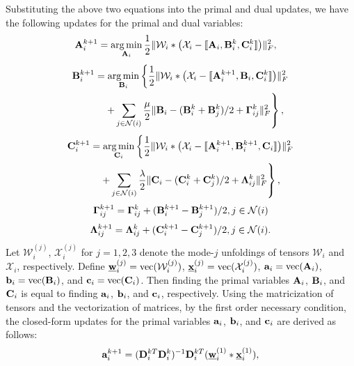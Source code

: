 \documentclass[journal]{IEEEtran}
\DeclareMathOperator*{\argmin}{arg\,min}
\newcommand{\cpd}[3]{\llbracket #1, #2, #3 \rrbracket}
\newcommand{\A}{{\bf A}}
\newcommand{\B}{{\bf B}}
\newcommand{\C}{{\bf C}}
\newcommand{\D}{{\bf D}}
\newcommand{\Ten}[1]{\mathcal{#1}}
\newcommand{\revision}[1]{{\color{black} #1}} %
\begin{document}
Substituting the above two equations into the primal and dual updates, we have the following updates for the primal and dual variables:
\begin{align*}
    \A_i^{k+1} &= \argmin_{\A_i}\frac{1}{2} \| \Ten{W}_i * \big(\Ten{X}_i - {\cpd{\A_i}{\B_i^k}{\C_i^k}} \big)\|_F^2,
\end{align*}
\begin{align*}
    \B_i^{k+1}& = \argmin_{\B_i} \left\{\frac{1}{2}\| \Ten{W}_i * \big(\Ten{X}_i - {\cpd{\A_i^{k+1}}{\B_i}{\C_i^k}} \big)\|_F^2\right.\\
    &\ \ \  \left.+\sum_{j\in\mathcal{N}(i)}\frac{\mu}{2}\|\B_i-{(\B_i^{k}+\B_j^{k})}/{2}+{\bf{\Gamma}}_{ij}^{k}\|_F^2\right\},
\end{align*}
\begin{align*}
    \C_i^{k+1} &= \argmin_{\C_i} \left\{\frac{1}{2}\| \Ten{W}_i * \big(\Ten{X}_i - {\cpd{\A_i^{k+1}}{\B_i^{k+1}}{\C_i}} \big)\|_F^2\right.\\
    &\ \ \  \left.+\sum_{j\in\mathcal{N}(i)}\frac{\lambda}{2}{\|}\C_i-(\C_i^{k}+\C_j^{k})/{2}+{\bf{\Lambda}}_{ij}^{k}{\|}_F^2\right\},
\end{align*}
\begin{equation}
\label{eq:dual1update}
    {\bf{\Gamma}}_{ij}^{k+1} = {\bf{\Gamma}}_{ij}^k +{(\B_i^{k+1}-\B_j^{k+1})}/{2},
j\in\mathcal{N}(i)
\end{equation}
\begin{equation}
    \label{eq:dual2update}
    {\bf{\Lambda}}_{ij}^{k+1} = {\bf{\Lambda}}_{ij}^k +{(\C_i^{k+1}-\C_j^{k+1})}/{2}, j\in\mathcal{N}(i).
\end{equation}
Let $\Ten{W}_i^{(j)}$, $\Ten{X}_i^{(j)}$ for $j=1,2,3$ denote the mode-$j$ unfoldings of tensors $\Ten{W}_i$ and $\Ten{X}_i$, respectively. Define $\underline{\bf w}_i^{(j)}=\text{vec}(\Ten{W}_i^{(j)})$, $\underline{\bf x}_i^{(j)}=\text{vec}(\Ten{X}_i^{(j)})$, ${\bf a}_i = \text{vec}(\A_i)$, ${\bf b}_i = \text{vec}(\B_i)$,  and ${\bf c}_i = \text{vec}(\C_i)$. Then finding the primal variables $\A_i$, $\B_i$, and $\C_i$ is equal to finding ${\bf a}_i$, ${\bf b}_i$, and ${\bf c}_i$, respectively.
\revision{Using the matricization of  tensors and the vectorization of matrices, by the first order necessary condition,}
the closed-form updates for the primal variables 
${\bf a}_i$, ${\bf b}_i$, and ${\bf c}_i$ are derived 
as follows:
\begin{equation}
\label{eq:primal1update}
    {\bf a}_i^{k+1} 
    =(\D_i^{kT}\D_i^k)^{-1}\D_i^{kT}(\underline{\bf w}_i^{(1)}* \underline{\bf x}_i^{(1)}),
\end{equation}
\end{document}
